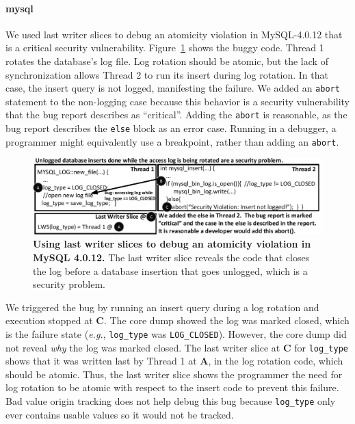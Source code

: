\documentclass[pageno,nohyperref]{jpaper}
\newcommand{\Caption}[1]{\begin{minipage}{.95\columnwidth} \caption{#1} \end{minipage} \vspace{-1.2ex}}
\begin{document}
\paragraph{mysql}

We used last writer slices to debug an atomicity violation in MySQL-4.0.12 that
is a critical security vulnerability.  Figure~\ref{fig:mysqllws} shows the
buggy code.  Thread 1 rotates the database's log file.  Log rotation should be
atomic, but the lack of synchronization allows Thread 2 to run its insert
during log rotation.  In that case, the insert query is not logged, manifesting
the failure.  We added an {\tt abort} statement to the non-logging case because
this behavior is a security vulnerability that the bug report describes as
``critical''.  Adding the {\tt abort} is reasonable, as the bug report
describes the {\tt else} block as an error case.  Running in a debugger, a
programmer might equivalently use a breakpoint, rather than adding an
{\tt abort}.


\begin{figure}[h]
\centering
\includegraphics[width=\columnwidth]{figs/MySQLDebug.pdf}
\Caption{\label{fig:mysqllws}{\bf Using last writer slices to debug an
atomicity violation in MySQL 4.0.12.} The last writer slice reveals the code that closes the log before a database insertion that goes unlogged, which is a security problem.}
\end{figure}

We triggered the bug by running an insert query during a log rotation and
execution stopped at {\bf C}.  The core dump showed the log was marked closed,
which is the failure state ({\em e.g.}, {\tt log\_type} was {\tt LOG\_CLOSED}).
However, the core dump did not reveal {\em why} the log was marked closed.  The
last writer slice at {\bf C} for {\tt log\_type} shows that it was written last
by Thread 1 at {\bf A}, in the log rotation code, which should be atomic.
Thus, the last writer slice shows the programmer the need for log rotation to
be atomic with respect to the insert code to prevent this failure.  Bad value
origin tracking does not help debug this bug because {\tt log\_type} only ever
contains usable values so it would not be tracked.  
\end{document}

